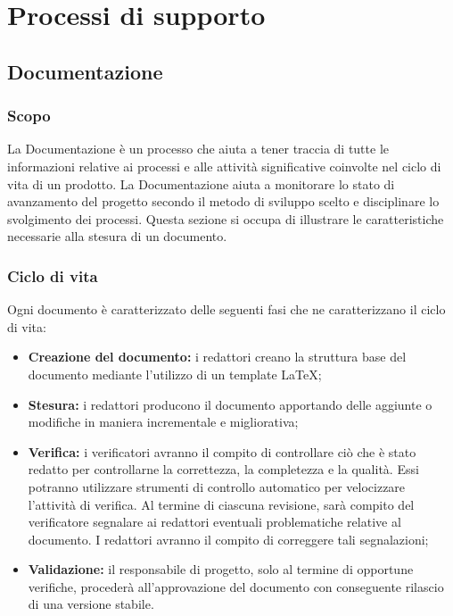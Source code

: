 \section{Processi di supporto}
  \subsection{Documentazione}

  \subsubsection{Scopo}
  La Documentazione è un processo che aiuta a tener traccia di tutte le informazioni relative ai processi e alle attività significative coinvolte nel ciclo di vita di un prodotto. La Documentazione aiuta a monitorare lo stato di avanzamento del progetto secondo il metodo di sviluppo scelto e disciplinare lo svolgimento dei processi. Questa sezione si occupa di illustrare le caratteristiche necessarie alla stesura di un documento. 

  \subsubsection{Ciclo di vita}
  Ogni documento è caratterizzato delle seguenti fasi che ne caratterizzano il ciclo di vita:
	\begin{itemize}
		\item \textbf{Creazione del documento:} i redattori creano la struttura base del documento mediante l'utilizzo di un template \LaTeX;
		\item \textbf{Stesura:} i redattori producono il documento apportando delle aggiunte o modifiche in maniera incrementale e migliorativa;
		\item \textbf{Verifica:} i verificatori avranno il compito di controllare ciò che è stato redatto per controllarne la correttezza, la completezza e la qualità. Essi potranno utilizzare strumenti di controllo automatico per velocizzare l'attività di verifica. Al termine di ciascuna revisione, sarà compito del verificatore segnalare ai redattori eventuali problematiche relative al documento. I redattori avranno il compito di correggere tali segnalazioni;
		\item \textbf{Validazione:} il responsabile di progetto, solo al termine di opportune verifiche, procederà all'approvazione del documento con conseguente rilascio di una versione stabile.
	\end{itemize}

